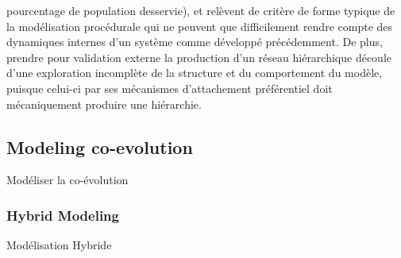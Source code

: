 {pourcentage de population desservie), et relèvent de critère de forme typique de la modélisation procédurale qui ne peuvent que difficilement rendre compte des dynamiques internes d'un système comme développé précédemment. De plus, prendre pour validation externe la production d'un réseau hiérarchique découle d'une exploration incomplète de la structure et du comportement du modèle, puisque celui-ci par ses mécanismes d'attachement préférentiel doit mécaniquement produire une hiérarchie.
}







\subsection{Modeling co-evolution}{Modéliser la co-évolution}


\subsubsection{Hybrid Modeling}{Modélisation Hybride}




